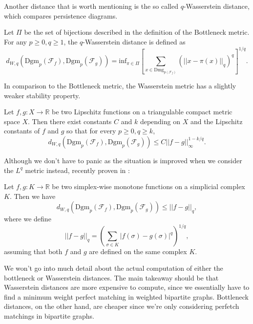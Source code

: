 Another distance that is worth mentioning is the so called $q$-Wasserstein distance, which compares persistence diagrams.

\begin{definition}
  Let $\Pi$ be the set of bijections described in the definition of the Bottleneck metric. For any $p \geq 0, q \geq 1$, the $q$-Wasserstein distance is defined as
  \begin{equation*}
    d_{W,q}(\text{Dgm}_{p}(\mathcal{F}_{f}), \text{Dgm}_{p}(\mathcal{F}_{g})) = \text{inf}_{\pi \in \Pi} \left[\sum_{x \in \text{Dmg}_{{p}(\mathcal{F}_{f})}} (||x - \pi(x)||_{q})^{q} \right]^{1/q}.
  \end{equation*}
\end{definition}

In comparison to the Bottleneck metric, the Wasserstein metric has a slightly weaker stability property.

\begin{theorem}
  Let $f,g: X \to \mathbb{R}$ be two Lipschitz functions on a triangulable compact metric space $X$. Then there exist constants $C$ and $k$ depending on $X$ and the Lipschitz constants of $f$ and $g$ so that for every $p \geq 0, q \geq k$,
  \begin{equation*}
    d_{W,q}(\text{Dgm}_{p}(\mathcal{F}_{f}), \text{Dgm}_{p}(\mathcal{F}_{g})) \leq C ||f-g||_{\infty}^{1 - k/q}.
  \end{equation*}
\end{theorem}

Although we don't have to panic as the situation is improved when we consider the $L^{q}$ metric instead, recently proven in \cite{skraba2020wasserstein}:

\begin{theorem}
  Let $f,g: K \to \mathbb{R}$ be two simplex-wise monotone functions on a simplicial complex $K$. Then we have
  \begin{equation*}
    d_{W,q}(\text{Dgm}_{p}(\mathcal{F}_{f}), \text{Dgm}_{p}(\mathcal{F}_{g})) \leq ||f-g||_{q},
  \end{equation*}
  where we define
  \begin{equation*}
    ||f-g||_{q} = (\sum_{\sigma \in K} |f(\sigma) - g(\sigma)|^{q})^{1/q},
  \end{equation*}
  assuming that both $f$ and $g$ are defined on the same complex $K$.
\end{theorem}

We won't go into much detail about the actual computation of either the bottleneck or Wasserstein distances. The main takeaway should be that Wasserstein distances are more expensive to compute, since we essentially have to find a minimum weight perfect matching in weighted bipartite graphs. Bottleneck distances, on the other hand, are cheaper since we're only considering perfetch matchings in bipartite graphs.

